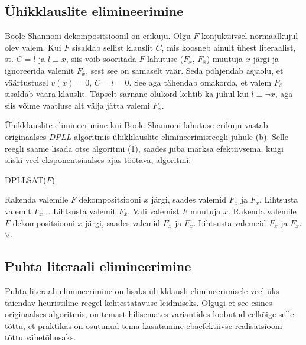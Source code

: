 \subsection{Ühikklauslite elimineerimine}

Boole-Shannoni dekompositsioonil on erikuju. Olgu $F$ konjuktiivsel
normaalkujul olev valem. Kui $F$ sisaldab sellist klauslit $C$, mis koosneb
ainult ühest literaalist, st. $C=l$ ja $l\equiv x$, siis võib sooritada $F$
lahutuse ($F_x$, $F_{\bar{x}}$) muutuja $x$ järgi ja ignoreerida valemit
$F_{\bar{x}}$, sest see on samaselt väär. Seda põhjendab asjaolu, et
väärtustusel $v(x)=0$, $C=l=0$. See aga tähendab omakorda, et valem
$F_{\bar{x}}$ sisaldab väära klauslit. Täpselt sarnane olukord kehtib ka juhul
kui $l\equiv\neg x$, aga siis võime vaatluse alt välja jätta valemi $F_x$.

Ühikklauslite elimineerimine kui Boole-Shannoni lahutuse erikuju vastab
originaalses \textit{DPLL} algoritmis ühikklauslite elimineerimisreegli juhule
(b). Selle reegli saame lisada otse algoritmi (1), saades juba märksa
efektiivsema, kuigi siiski veel eksponentsiaalses ajas töötava, algoritmi:

\begin{algorithm}{DPLLSAT($F$)}
\abody

\begin{algorithmic}[1]
	\RETURN \TRUE
{}
	\RETURN \FALSE
{}
	\STATE Rakenda valemile $F$ dekompositsiooni $x$ järgi, saades valemid
	$F_x$ ja $F_{\bar{x}}$.
		\STATE Lihtsusta valemit $F_x$.
		\RETURN {}.
	\ELSE
		\STATE Lihtsusta valemit $F_{\bar{x}}$.
		\RETURN {}
	\ENDIF
\ELSE
	\STATE Vali valemist $F$ muutuja $x$.
	\STATE Rakenda valemile $F$ dekompositsiooni $x$ järgi, saades valemid $F_x$
	ja $F_{\bar{x}}$.
	\STATE Lihtsusta valemeid $F_x$ ja $F_{\bar{x}}$.
	\RETURN {}$\vee$.
\ENDIF
\end{algorithmic}
\end{algorithm}

\subsection{Puhta literaali elimineerimine}

Puhta literaali elimineerimine on lisaks ühikklausli elimineerimisele veel üks
täiendav heuristiline reegel kehtestatavuse leidmiseks. Olgugi et see esines
originaalses  algoritmis, on temast hilisemates variantides
loobutud eelkõige selle tõttu, et praktikas on osutunud tema kasutamine
ebaefektiivse realisatsiooni tõttu vähetõhusaks.

